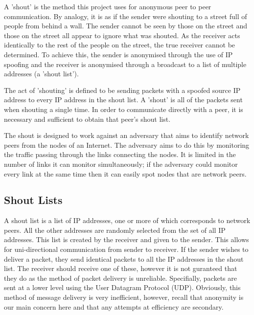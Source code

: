 \documentclass[ %
                    author={Luke Murray},
                supervisor={Dr. Simon Hollis},
                     title={Shadow Peer-to-Peer Networks},
                  subtitle={},
                    degree={MEng},
                      year={2013} ]{thesis}
\begin{document}
A 'shout' is the method this project uses for anonymous peer to peer communication. By analogy, it is as if the sender were shouting to a street full of people from behind a wall. The sender cannot be seen by those on the street and those on the street all appear to ignore what was shouted. As the receiver acts identically to the rest of the people on the street, the true receiver cannot be determined. To achieve this, the sender is anonymised through the use of IP spoofing and the receiver is anonymised through a broadcast to a list of multiple addresses (a 'shout list').

The act of 'shouting' is defined to be sending packets with a spoofed source IP address to every IP address in the shout list. A 'shout' is all of the packets sent when shouting a single time. In order to communicate directly with a peer, it is necessary and sufficient to obtain that peer's shout list.

The shout is designed to work against an adversary that aims to identify network peers from the nodes of an Internet. The adversary aims to do this by monitoring the traffic passing through the links connecting the nodes. It is limited in the number of links it can monitor simultaneously; if the adversary could monitor every link at the same time then it can easily spot nodes that are network peers.

\subsection{Shout Lists}

A shout list is a list of IP addresses, one or more of which corresponds to network peers. All the other addresses are randomly selected from the set of all IP addresses. This list is created by the receiver and given to the sender. This allows for uni-directional communication from sender to receiver. If the sender wishes to deliver a packet, they send identical packets to all the IP addresses in the shout list. The receiver should receive one of these, however it is not guranteed that they do as the method of packet delivery is unreliable. Specifially, packets are sent at a lower level using the User Datagram Protocol (UDP). Obviously, this method of message delivery is very inefficient, however, recall that anonymity is our main concern here and that any attempts at efficiency are secondary.
\end{document}
